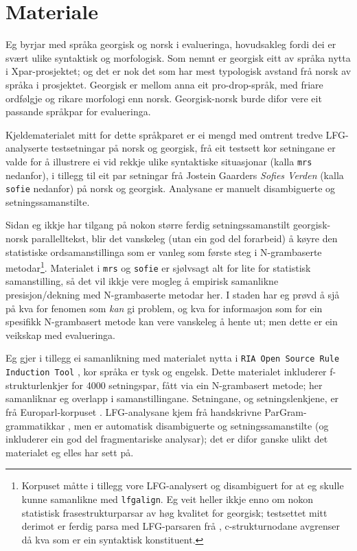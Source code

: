 \documentclass[12pt,a4paper,oneside,draft]{report}
\begin{document}
  
\section{Materiale}
\label{sec-5.1}

Eg byrjar med språka georgisk og norsk i evalueringa, hovudsakleg
 fordi dei er svært ulike syntaktisk og morfologisk. Som nemnt er
 georgisk eitt av språka nytta i Xpar-prosjektet; og det er nok det
 som har mest typologisk avstand frå norsk av språka i prosjektet.
 Georgisk er mellom anna eit pro-drop-språk, med friare ordfølgje og
 rikare morfologi enn norsk. Georgisk-norsk burde difor vere eit
 passande språkpar for evalueringa.

Kjeldematerialet mitt for dette språkparet er ei mengd med
 omtrent tredve LFG-analyserte testsetningar på norsk og georgisk, frå
 eit testsett kor setningane er valde for å illustrere ei vid rekkje
 ulike syntaktiske situasjonar (kalla \texttt{mrs} nedanfor), i tillegg til
 eit par setningar frå Jostein Gaarders \emph{Sofies Verden} (kalla \texttt{sofie}
 nedanfor) på norsk og georgisk. Analysane er manuelt disambiguerte og
 setningssamanstilte.

Sidan eg ikkje har tilgang på nokon større ferdig setningssamanstilt
 georgisk-norsk parallelltekst, blir det vanskeleg (utan ein god del
 forarbeid) å køyre den statistiske ordsamanstillinga som er vanleg
 som første steg i N-grambaserte metodar\footnote{Korpuset måtte i tillegg vore LFG-analysert og disambiguert
        for at eg skulle kunne samanlikne med \texttt{lfgalign}. Eg veit
        heller ikkje enno om nokon statistisk frasestrukturparsar av
        høg kvalitet for georgisk; testsettet mitt derimot er ferdig
        parsa med LFG-parsaren frå \citet{meurer2008cgg},
        c-strukturnodane avgrenser då kva som er ein syntaktisk
        konstituent. }. Materialet i \texttt{mrs}
 og \texttt{sofie} er sjølvsagt alt for lite for statistisk samanstilling, så
 det vil ikkje vere mogleg å empirisk samanlikne presisjon/dekning med
 N-grambaserte metodar her. I staden har eg prøvd å sjå på kva for
 fenomen som \emph{kan} gi problem, og kva for informasjon som for ein
 spesifikk N-grambasert metode kan vere vanskeleg å hente ut; men
 dette er ein veikskap med evalueringa.

Eg gjer i tillegg ei samanlikning med materialet nytta i \texttt{RIA Open  Source Rule Induction Tool} \citep{graham2009osr,graham2009fts}, kor
 språka er tysk og engelsk. Dette materialet inkluderer
 f-strukturlenkjer for 4000 setningspar, fått via ein N-grambasert
 metode; her samanliknar eg overlapp i samanstillingane.  Setningane,
 og setningslenkjene, er frå Europarl-korpuset
 \citep{koehn2005epc}. LFG-analysane kjem frå handskrivne
 ParGram-grammatikkar \citep[m.a.~][]{kaplan2002aeg}, men er automatisk
 disambiguerte og setningssamanstilte (og inkluderer ein god del
 fragmentariske analysar); det er difor ganske ulikt det materialet eg
 elles har sett på.
\end{document}
